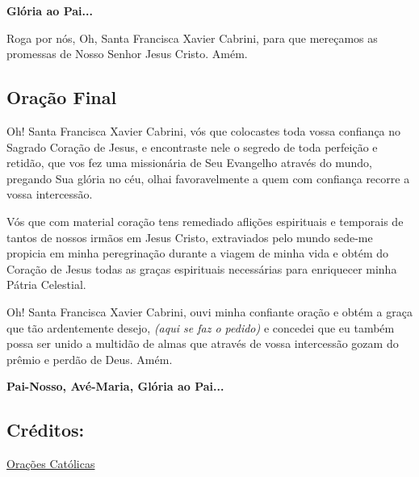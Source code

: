 \documentclass[11pt]{article}
\begin{document}
\textbf{Glória ao Pai...}

Roga por nós, Oh, Santa Francisca Xavier Cabrini, para que mereçamos as promessas de Nosso Senhor Jesus Cristo. Amém.

\subsection{Oração Final}
Oh! Santa Francisca Xavier Cabrini, vós que colocastes toda vossa confiança no Sagrado Coração de Jesus, e encontraste nele o segredo de toda perfeição e retidão, que vos fez uma missionária de Seu Evangelho através do mundo, pregando Sua glória no céu, olhai favoravelmente a quem com confiança recorre a vossa intercessão.

Vós que com material coração tens remediado aflições espirituais e temporais de tantos de nossos irmãos em Jesus Cristo, extraviados pelo mundo sede-me propicia em minha peregrinação durante a viagem de minha vida e obtém do Coração de Jesus todas as graças espirituais necessárias para enriquecer minha Pátria Celestial.

Oh! Santa Francisca Xavier Cabrini, ouvi minha confiante oração e obtém a graça que tão ardentemente desejo, \emph{(aqui se faz o pedido)} e concedei que eu também possa ser unido a multidão de almas que através de vossa intercessão gozam do prêmio e perdão de Deus. Amém.


\textbf{Pai-Nosso, Avé-Maria, Glória ao Pai... }

\subsection*{Créditos:}
\href{https://oracoes.info/NovenasSantas08.html}{Orações Católicas}
\end{document}
